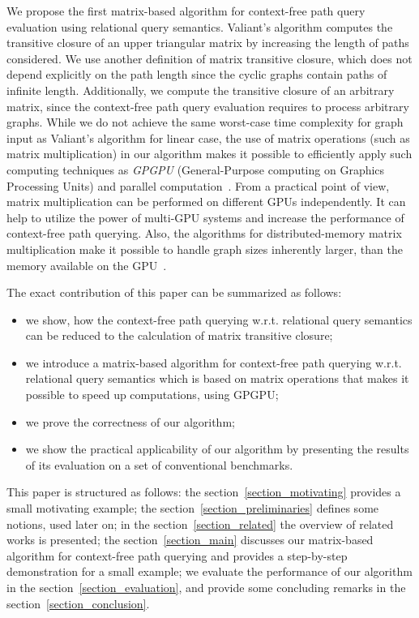 We propose the first matrix-based algorithm for context-free path query evaluation using relational query semantics. Valiant's algorithm computes the transitive closure of an upper triangular matrix by increasing the length of paths considered. We use another definition of matrix transitive closure, which does not depend explicitly on the path length since the cyclic graphs contain paths of infinite length. Additionally, we compute the transitive closure of an arbitrary matrix, since the context-free path query evaluation requires to process arbitrary graphs. While we do not achieve the same worst-case time complexity for graph input as Valiant's algorithm for linear case, the use of matrix operations (such as matrix multiplication) in our algorithm makes it possible to efficiently apply such computing techniques as \emph{GPGPU} (General-Purpose computing on Graphics Processing Units) and parallel computation~\cite{matricesOnGPGPU}. From a practical point of view, matrix multiplication can be performed on different GPUs independently. It can help to utilize the power of multi-GPU systems and increase the performance of context-free path querying. Also, the algorithms for distributed-memory matrix multiplication make it possible to handle graph sizes inherently larger, than the memory available on the GPU~\cite{MM_on_multi-GPU, hetero_multi-GPU, choi1994pumma}.

The exact contribution of this paper can be summarized as follows:

\begin{itemize}
\item we show, how the context-free path querying w.r.t. relational query semantics can be reduced to the calculation of matrix transitive closure;
\item we introduce a matrix-based algorithm for context-free path querying w.r.t. relational query semantics which is based on matrix operations that makes it possible to speed up computations, using GPGPU;
\item we prove the correctness of our algorithm;
\item we show the practical applicability of our algorithm by presenting the results of its evaluation on a set of conventional benchmarks.
\end{itemize}

This paper is structured as follows: the section~\ref{section_motivating} provides a small motivating example; the section~\ref{section_preliminaries} defines some notions, used later on; in the section~\ref{section_related} the overview of related works is presented; the section~\ref{section_main} discusses our matrix-based algorithm for context-free path querying and provides a step-by-step demonstration for a small example;  we evaluate the performance of our algorithm in the section~\ref{section_evaluation}, and provide some concluding remarks in the section~\ref{section_conclusion}.
